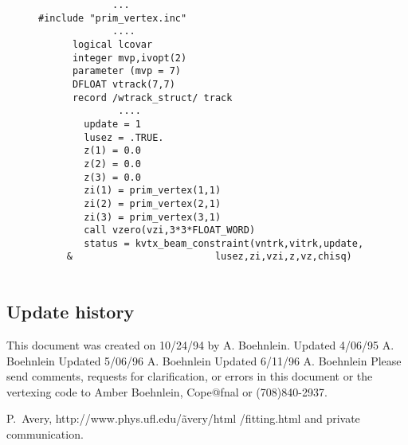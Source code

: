 \begin{figure}
\begin{tt}
\begin{verbatim}
             ...
#include "prim_vertex.inc"
             ....
      logical lcovar
      integer mvp,ivopt(2)       
      parameter (mvp = 7)
      DFLOAT vtrack(7,7)
      record /wtrack_struct/ track
              ....
        update = 1
        lusez = .TRUE.
        z(1) = 0.0
        z(2) = 0.0
        z(3) = 0.0
        zi(1) = prim_vertex(1,1)
        zi(2) = prim_vertex(2,1)
        zi(3) = prim_vertex(3,1)
        call vzero(vzi,3*3*FLOAT_WORD)
        status = kvtx_beam_constraint(vntrk,vitrk,update,
     &                         lusez,zi,vzi,z,vz,chisq)
        
\end{verbatim}
\end{tt}
\label{code:constraint}
\end{figure}
\subsection{Update history}
This document was created on 10/24/94 by A. Boehnlein.\newline
Updated 4/06/95 A. Boehnlein\newline
Updated 5/06/96 A. Boehnlein\newline
Updated 6/11/96 A. Boehnlein\newline
Please send comments, requests for clarification, or errors 
in this document or the vertexing code to Amber Boehnlein,
Cope@fnal or (708)840-2937.

\begin{thebibliography}{99}
P.~Avery, http://www.phys.ufl.edu/\~avery/html
/fitting.html and private communication.
\end{thebibliography}


